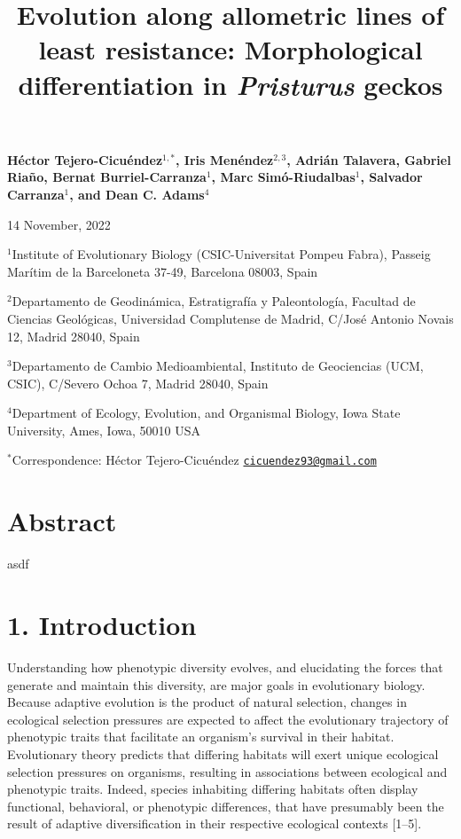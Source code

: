 \documentclass[
  11pt,
]{article}
\title{Evolution along allometric lines of least resistance:
Morphological differentiation in \emph{Pristurus} geckos}
\author{}
\date{\vspace{-2.5em}}
\begin{document}
\maketitle

\begin{center}
\textbf{H{\'{e}}ctor Tejero-Cicu{\'{e}}ndez$^{1,*}$,  Iris Men{\'{e}}ndez$^{2,3}$, Adri{\'{a}}n Talavera, Gabriel Riaño, Bernat Burriel-Carranza$^{1}$, Marc Sim{\'{o}}-Riudalbas$^{1}$, Salvador Carranza$^{1}$, and Dean C. Adams$^{4}$}
\end{center}

\begin{center}14 November, 2022\end{center}

\(^{1}\)Institute of Evolutionary Biology (CSIC-Universitat Pompeu
Fabra), Passeig Marítim de la Barceloneta 37-49, Barcelona 08003, Spain

\(^{2}\)Departamento de Geodinámica, Estratigrafía y Paleontología,
Facultad de Ciencias Geológicas, Universidad Complutense de Madrid,
C/José Antonio Novais 12, Madrid 28040, Spain

\(^{3}\)Departamento de Cambio Medioambiental, Instituto de Geociencias
(UCM, CSIC), C/Severo Ochoa 7, Madrid 28040, Spain

\(^{4}\)Department of Ecology, Evolution, and Organismal Biology, Iowa
State University, Ames, Iowa, 50010 USA

\(^{*}\)Correspondence: Héctor Tejero-Cicuéndez
\href{mailto:cicuendez93@gmail.com}{\nolinkurl{cicuendez93@gmail.com}}

\newpage

\hypertarget{abstract}{%
\section{Abstract}\label{abstract}}

asdf

\newpage

\hypertarget{introduction}{%
\section{1. Introduction}\label{introduction}}

Understanding how phenotypic diversity evolves, and elucidating the
forces that generate and maintain this diversity, are major goals in
evolutionary biology. Because adaptive evolution is the product of
natural selection, changes in ecological selection pressures are
expected to affect the evolutionary trajectory of phenotypic traits that
facilitate an organism's survival in their habitat. Evolutionary theory
predicts that differing habitats will exert unique ecological selection
pressures on organisms, resulting in associations between ecological and
phenotypic traits. Indeed, species inhabiting differing habitats often
display functional, behavioral, or phenotypic differences, that have
presumably been the result of adaptive diversification in their
respective ecological contexts {[}1--5{]}. \hfill\break
\end{document}
